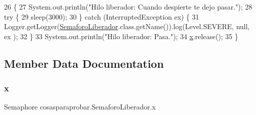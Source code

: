 \begin{DoxyCode}
26                       \{
27         System.out.println(\textcolor{stringliteral}{"Hilo liberador: Cuando despierte te dejo pasar."});
28         \textcolor{keywordflow}{try} \{
29             sleep(3000);
30         \} \textcolor{keywordflow}{catch} (InterruptedException ex) \{
31             Logger.getLogger(\mbox{\hyperlink{classcosasparaprobar_1_1_semaforo_liberador_a4b87cbb393e66de3dcc8727741649b11}{SemaforoLiberador}}.class.getName()).log(Level.SEVERE, null, ex
      );
32         \}
33         System.out.println(\textcolor{stringliteral}{"Hilo liberador: Pasa."});
34         \mbox{\hyperlink{classcosasparaprobar_1_1_semaforo_liberador_aa58c46d88298972b9a7ba1c78ff9ab30}{x}}.release();
35     \}
\end{DoxyCode}


\subsection{Member Data Documentation}
\mbox{\label{classcosasparaprobar_1_1_semaforo_liberador_aa58c46d88298972b9a7ba1c78ff9ab30}} 
\subsubsection{\texorpdfstring{x}{x}}
{\footnotesize\ttfamily Semaphore cosasparaprobar.\+Semaforo\+Liberador.\+x\hspace{0.3cm}{\ttfamily [package]}}

